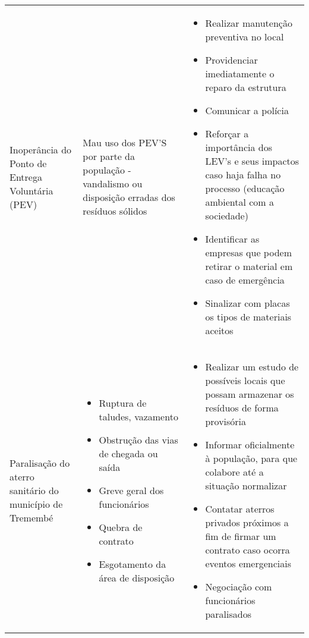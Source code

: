 \begin{table}[htbp]
{\begin{tabular}{P{12.93em}|P{10.645em}|P{18em}}
     Inoperância do Ponto de Entrega Voluntária (PEV) & Mau uso dos PEV’S por parte da população - vandalismo ou disposição erradas dos resíduos sólidos & \begin{itemize} \item Realizar manutenção preventiva no local\item Providenciar imediatamente o reparo da estrutura\item Comunicar a polícia\item Reforçar a importância dos LEV’s e seus impactos caso haja falha no processo (educação ambiental com a sociedade)\item Identificar as empresas que podem retirar o material em caso de emergência\item Sinalizar com placas os tipos de materiais aceitos \end{itemize} \\
     Paralisação do aterro sanitário do município de Tremembé & \begin{itemize} \item Ruptura de taludes, vazamento\item Obstrução das vias de chegada ou saída\item Greve geral dos funcionários\item Quebra de contrato \item Esgotamento da área de disposição \end{itemize} & \begin{itemize} \item Realizar um estudo de possíveis locais que possam armazenar os resíduos de forma provisória\item Informar oficialmente à população, para que colabore até a situação normalizar\item Contatar aterros privados próximos a fim de firmar um contrato caso ocorra eventos emergenciais\item Negociação com funcionários paralisados \end{itemize} \\
    \end{tabular}%
}
  \label{tab:acoes_emerg_cont}%
\end{table}%
